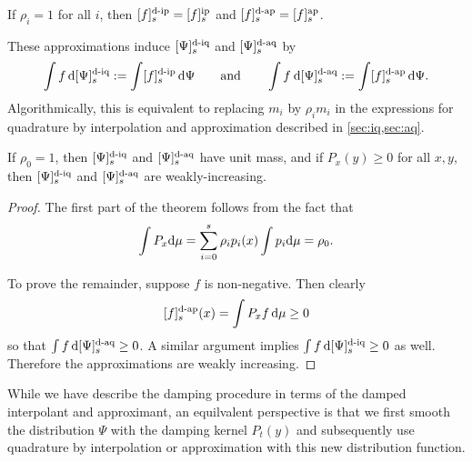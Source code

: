 \begin{remark}
If  \( \rho_{i} = 1 \) for all \( i \),  then \( \ff[d-i]{f}{s} = \ff[i]{f}{s} \) and \( \ff[d-a]{f}{s} = \ff[a]{f}{s} \).
\end{remark}


These approximations induce  \( \qq[d-i]{\Psi}{s} \) and \( \qq[d-a]{\Psi}{s} \) by
\begin{equation*}
    \int f \,\d\qq[d-i]{\Psi}{s}
    := \int \ff[d-i]{f}{s} \,\d\Psi
    \qquad\text{and}\qquad
    \int f \:  \d\qq[d-a]{\Psi}{s}
    := \int \ff[d-a]{f}{s} \,\d\Psi.
\end{equation*}
Algorithmically, this is equivalent to replacing \( m_i \) by \( \rho_{i}^{} m_i \) in the expressions for quadrature by interpolation and approximation described in \cref{sec:iq,sec:aq}.

\begin{lemma}
If \( \rho_0 = 1 \), then \( \qq[d-i]{\Psi}{s} \) and \( \qq[d-a]{\Psi}{s} \) have unit mass, and if \( P_x(y) \geq 0 \) for all \( x,y \), then \( \qq[d-i]{\Psi}{s} \) and \( \qq[d-a]{\Psi}{s} \) are weakly-increasing.
\end{lemma}

\begin{proof}
The first part of the theorem follows from the fact that
\begin{equation*}
    \int P_x \textup{d}\mu
    = \sum_{i=0}^{s} \rho_i p_i(x) \int p_i\textup{d}\mu
    = \rho_{0}.
\end{equation*}

To prove the remainder, suppose \( f \) is non-negative. 
Then clearly 
\begin{equation*}
    \ff[d-a]{f}{s}(x) = \int P_{x} f \,\d\mu
    \geq 0
\end{equation*}
so that \( \int f\,\d\qq[d-a]{\Psi}{s} \geq 0 \).
A similar argument implies \( \int f\,\d\qq[d-i]{\Psi}{s} \geq 0 \) as well.
Therefore the approximations are weakly increasing. 
\end{proof}

\begin{remark}
    While we have describe the damping procedure in terms of the damped interpolant and approximant, an equilvalent perspective is that we first smooth the distribution \( \Psi \) with the damping kernel \( P_t(y) \) and subsequently use quadrature by interpolation or approximation with this new distribution function.
\end{remark}



